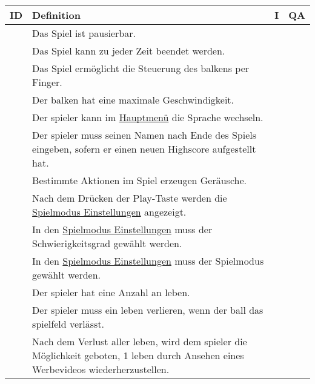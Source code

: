 \begin{xltabular}{\textwidth}{|l|X|r|r|}
    \hline
    \textbf{ID} & \textbf{Definition}   & \textbf{I}    & \textbf{QA}                                           \\
    \hline

    \setSystem{\ref*{sys:gen}}  %

       & Das Spiel ist pausierbar.             &      &      \\ \hline
       & Das Spiel kann zu jeder Zeit beendet werden.             &      &      \\ \hline
       & Das Spiel ermöglicht die Steuerung des \glspl{balken} per Finger.             &      &     \\ \hline
       & Der \gls{balken} hat eine maximale Geschwindigkeit.        &           &         \\ \hline

    \setSystem{\ref*{sys:ui}}   %

       & \OPT{*} Der \gls{spieler} kann im \hyperref[fig:dia:mainMenu]{Hauptmenü} die Sprache wechseln.             &      &      \\ \hline
       & Der \gls{spieler} muss seinen Namen nach Ende des Spiels eingeben, sofern er einen neuen Highscore aufgestellt hat.        &      &      \\ \hline
       & \OPT{*} Bestimmte Aktionen im Spiel erzeugen Geräusche.             &      &      \\ \hline
       & Nach dem Drücken der Play-Taste werden die \hyperref[fig:dia:gameMode]{Spielmodus Einstellungen} angezeigt.             &      &      \\ \hline
       & In den \hyperref[fig:dia:gameMode]{Spielmodus Einstellungen} muss der Schwierigkeitsgrad gewählt werden.             &      &      \\ \hline
       & \OPT{*}In den \hyperref[fig:dia:gameMode]{Spielmodus Einstellungen} muss der Spielmodus gewählt werden.             &      &      \\ \hline
    
    \setSystem{\ref*{sys:ls}}   %

       & Der \gls{spieler} hat eine Anzahl an \gls{leben}.             &      &      \\ \hline
      & Der \gls{spieler} muss ein \gls{leben} verlieren, wenn der \gls{ball} das \gls{spielfeld} verlässt. &      &      \\ \hline
      & Nach dem Verlust aller \gls{leben}, wird dem \gls{spieler} die Möglichkeit geboten, 1 \gls{leben} durch Ansehen eines Werbevideos wiederherzustellen.        &      &      \\ \hline


\end{xltabular}
